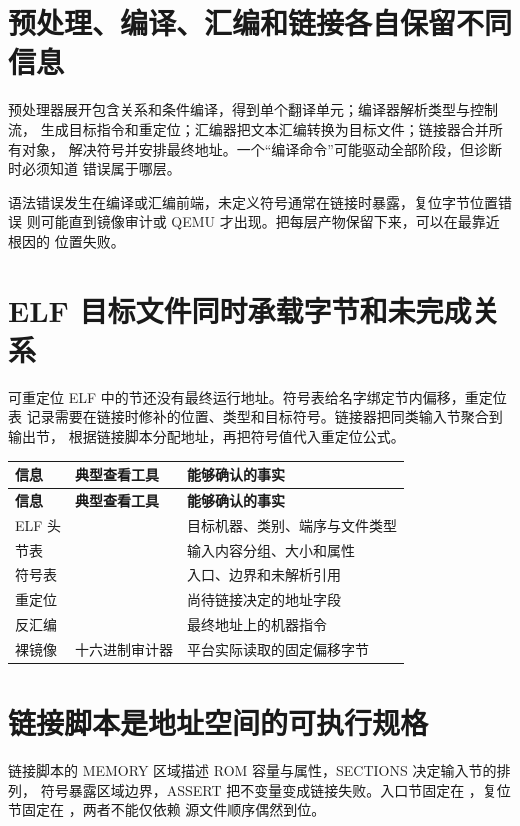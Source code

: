 \section{预处理、编译、汇编和链接各自保留不同信息}

预处理器展开包含关系和条件编译，得到单个翻译单元；编译器解析类型与控制流，
生成目标指令和重定位；汇编器把文本汇编转换为目标文件；链接器合并所有对象，
解决符号并安排最终地址。一个“编译命令”可能驱动全部阶段，但诊断时必须知道
错误属于哪层。

语法错误发生在编译或汇编前端，未定义符号通常在链接时暴露，复位字节位置错误
则可能直到镜像审计或 QEMU 才出现。把每层产物保留下来，可以在最靠近根因的
位置失败。

\section{ELF 目标文件同时承载字节和未完成关系}

可重定位 ELF 中的节还没有最终运行地址。符号表给名字绑定节内偏移，重定位表
记录需要在链接时修补的位置、类型和目标符号。链接器把同类输入节聚合到输出节，
根据链接脚本分配地址，再把符号值代入重定位公式。

\begin{longtable}{L{0.19\textwidth}L{0.26\textwidth}L{0.41\textwidth}}
\toprule
\textbf{信息} & \textbf{典型查看工具} & \textbf{能够确认的事实}\\
\midrule
\endfirsthead
\toprule
\textbf{信息} & \textbf{典型查看工具} & \textbf{能够确认的事实}\\
\midrule
\endhead
ELF 头 &  & 目标机器、类别、端序与文件类型\\
节表 &  & 输入内容分组、大小和属性\\
符号表 &  & 入口、边界和未解析引用\\
重定位 &  & 尚待链接决定的地址字段\\
反汇编 &  & 最终地址上的机器指令\\
裸镜像 & 十六进制审计器 & 平台实际读取的固定偏移字节\\
\bottomrule
\end{longtable}

\section{链接脚本是地址空间的可执行规格}

链接脚本的 MEMORY 区域描述 ROM 容量与属性，SECTIONS 决定输入节的排列，
符号暴露区域边界，ASSERT 把不变量变成链接失败。入口节固定在
，复位节固定在 ，两者不能仅依赖
源文件顺序偶然到位。

